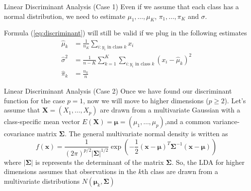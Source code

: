 \documentclass{beamer}
\begin{document}
\begin{frame}{Linear Discriminant Analysis (Case 1)}
	Even if we assume that each class has a normal distribution, we need to estimate $\mu_1, \ldots , \mu_K$, $\pi_1,\ldots,\pi_K$ and $\sigma$. 
	
	Formula (\ref{eq:discriminant}) will still be valid if we plug in the following estimates
	\begin{equation*}
		\begin{split}
			\hat{\mu}_k&= \frac{1}{n_K} \sum_{i:y_i  \textrm{ in class }k} x_i\\
		\hat{\sigma}^2 &= \frac{1}{n-K} \sum_{k=1}^{K} \sum_{i:y_i  \textrm{ in class } k}	 (x_i -\hat{\mu}_k)^2\\
		\hat{\pi}_k &= \frac{n_k}{n}
	\end{split}
	\end{equation*}
\end{frame}

\begin{frame}{Linear Discriminant Analysis (Case 2)}
	Once we have found our discriminant function for the case $p=1$, now we will move to higher dimensions ($p\ge 2$).  Let's assume that $\mathbf{X}=(X_1,\ldots, X_p)$ are drawn from a multivariate Gaussian with a class-specific mean vector $E(\bm{X})=\bm{\mu}=(\mu_1,\ldots,\mu_p)$,and a common variance-covariance matrix $\bm\Sigma$. 
	The general multivariate normal density is written as
	\begin{equation}
		f(\bm{x})= \frac{1}{(2 \pi)^{p/2} | \bm{\Sigma} |^{1/2}}\exp\left( - \frac{1}{2} (\bm{x} - \bm{\mu})^T \bm{\Sigma}^{-1} (\bm{x}-\bm{\mu}) \right)
	\end{equation}	
where $|\bm{\Sigma}|$ is represents the determinant of the matrix $\bm{\Sigma}$. So, the LDA for higher dimensions assumes that observations in the $k$th class are drawn from a multivariate distributions $N(\bm{\mu}_k, \bm{\Sigma})$ 

\end{frame}
\end{document}
